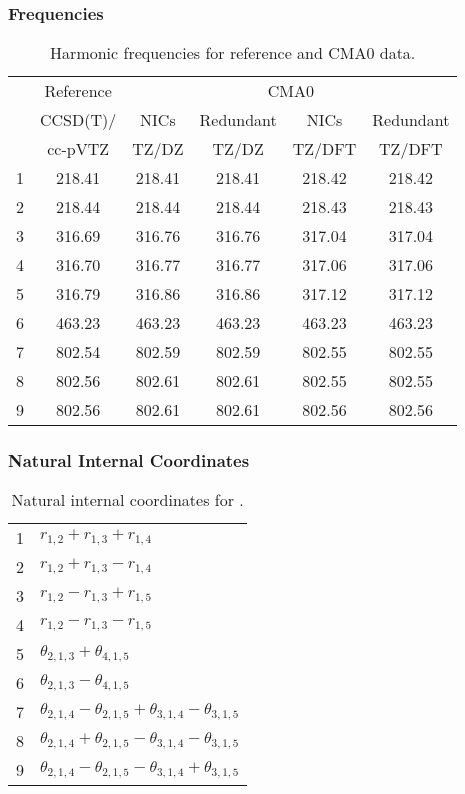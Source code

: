 \documentclass[10pt,oneside]{article}
\begin{document}
\begin{table}[h!]
\subsubsection*{Frequencies}
\centering
\caption{Harmonic frequencies for reference and CMA0 data.}
\begin{tabular}{cccccc}
\toprule
{} & Reference & \multicolumn{4}{c}{CMA0} \\
{} &  CCSD(T)/ &   NICs &  Redundant &   NICs & Redundant \\
{} &   cc-pVTZ &  TZ/DZ &      TZ/DZ & TZ/DFT &    TZ/DFT \\
\midrule
1 &    218.41 & 218.41 &     218.41 & 218.42 &    218.42 \\
2 &    218.44 & 218.44 &     218.44 & 218.43 &    218.43 \\
3 &    316.69 & 316.76 &     316.76 & 317.04 &    317.04 \\
4 &    316.70 & 316.77 &     316.77 & 317.06 &    317.06 \\
5 &    316.79 & 316.86 &     316.86 & 317.12 &    317.12 \\
6 &    463.23 & 463.23 &     463.23 & 463.23 &    463.23 \\
7 &    802.54 & 802.59 &     802.59 & 802.55 &    802.55 \\
8 &    802.56 & 802.61 &     802.61 & 802.55 &    802.55 \\
9 &    802.56 & 802.61 &     802.61 & 802.56 &    802.56 \\
\bottomrule
\end{tabular}
\end{table}

\begin{table}[h!]
\subsubsection*{Natural Internal Coordinates}
\centering
\caption{Natural internal coordinates for .}
\small
\begin{tabular}{ll}
\toprule
  1   & $r_{1,2} + r_{1,3} + r_{1,4}$ \\
  2   & $r_{1,2} + r_{1,3} - r_{1,4}$ \\
  3   & $r_{1,2} - r_{1,3} + r_{1,5}$ \\
  4   & $r_{1,2} - r_{1,3} - r_{1,5}$ \\
  5   & $\theta_{2,1,3} + \theta_{4,1,5}$ \\
  6   & $\theta_{2,1,3} - \theta_{4,1,5}$ \\
  7   & $\theta_{2,1,4} - \theta_{2,1,5} + \theta_{3,1,4} - \theta_{3,1,5}$ \\
  8   & $\theta_{2,1,4} + \theta_{2,1,5} - \theta_{3,1,4} - \theta_{3,1,5}$ \\
  9   & $\theta_{2,1,4} - \theta_{2,1,5} - \theta_{3,1,4} + \theta_{3,1,5}$ \\
\bottomrule
\end{tabular}
\end{table}
\end{document}
